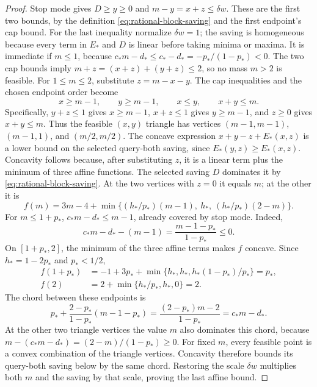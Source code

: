 \begin{proof}
Stop mode gives $D\ge y\ge0$ and $m-y=x+z\le\delta w$.
These are the first two bounds, by the definition
\eqref{eq:rational-block-saving} and the first endpoint's cap bound.
For the last inequality normalize $\delta w=1$; the saving is
homogeneous because every term in $E_*$ and $D$ is linear before
taking minima or maxima. It is immediate
if $m\le1$, because $c_*m-d_*\le c_*-d_*=-p_*/(1-p_*)<0$.
The two cap bounds imply $m+z=(x+z)+(y+z)\le2$, so no mass
$m>2$ is feasible. For $1\le m\le2$, substitute $z=m-x-y$.
The cap inequalities and
the chosen endpoint order become
\[
 x\ge m-1,\qquad y\ge m-1,\qquad x\le y,\qquad x+y\le m.
\]
Specifically, $y+z\le1$ gives $x\ge m-1$, $x+z\le1$
gives $y\ge m-1$, and $z\ge0$ gives $x+y\le m$.
Thus the feasible $(x,y)$ triangle has
vertices $(m-1,m-1)$, $(m-1,1)$, and $(m/2,m/2)$.
The concave expression $x+y-z+E_*(x,z)$ is a lower bound on the
selected query-both saving, since $E_*(y,z)\ge E_*(x,z)$.
Concavity follows because, after substituting $z$, it is a linear
term plus the minimum of three affine functions. The selected
saving $D$ dominates it by \eqref{eq:rational-block-saving}.
At the two vertices with $z=0$ it equals $m$; at the other it is
\[
 f(m)=3m-4+\min\{(h_*/p_*)(m-1),\ h_*,\ (h_*/p_*)(2-m)\}.
\]
For $m\le1+p_*$, $c_*m-d_*\le m-1$, already covered by stop mode.
Indeed,
\[
 c_*m-d_*-(m-1)=\frac{m-1-p_*}{1-p_*}\le0.
\]
On $[1+p_*,2]$, the minimum of the three affine terms makes $f$
concave. Since $h_*=1-2p_*$ and $p_*<1/2$,
\[
 \begin{aligned}
 f(1+p_*)&=-1+3p_*+
   \min\{h_*,h_*,h_*(1-p_*)/p_*\}=p_*,\\
 f(2)&=2+\min\{h_*/p_*,h_*,0\}=2.
 \end{aligned}
\]
The chord between these endpoints is
\[
 p_*+\frac{2-p_*}{1-p_*}(m-1-p_*)
 =\frac{(2-p_*)m-2}{1-p_*}=c_*m-d_*.
\]
At the other two triangle vertices the value $m$ also dominates
this chord, because
$m-(c_*m-d_*)=(2-m)/(1-p_*)\ge0$.
For fixed $m$, every feasible point is a convex combination of
the triangle vertices. Concavity therefore bounds its query-both
saving below by the same chord. Restoring the scale $\delta w$
multiplies both $m$ and the saving by that scale, proving the last
affine bound.
\end{proof}

